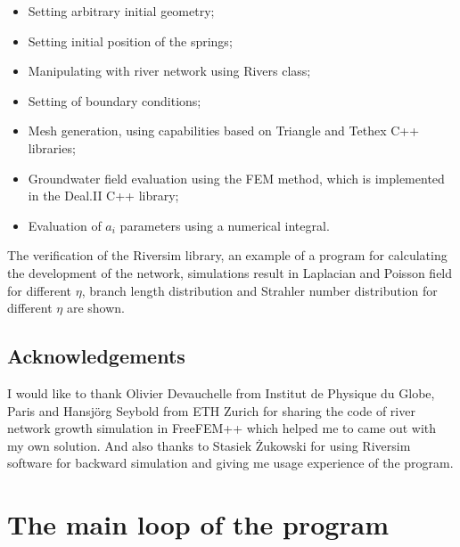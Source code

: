 \documentclass[]{pracamgr}
\begin{document}
    \vspace{-\topsep}
    \begin{itemize}
      \item Setting arbitrary initial geometry;
      \item Setting initial position of the springs;
      \item Manipulating with river network using Rivers class;
      \item Setting of boundary conditions;
      \item Mesh generation, using capabilities based on Triangle and Tethex C++ libraries;
      \item Groundwater field evaluation using the FEM method, which is implemented in the Deal.II C++ library;
      \item Evaluation of $a_i$ parameters using a numerical integral.
    \end{itemize}

    The verification of the Riversim library, an example of a program for calculating the development of the network, simulations result in Laplacian and Poisson field for different $\eta$, branch length distribution and Strahler number distribution for different $\eta$ are shown.\par

    \section*{Acknowledgements}
      
      I would like to thank Olivier Devauchelle from Institut de Physique du Globe, Paris and Hansjörg Seybold from ETH Zurich for sharing the code of river network growth simulation in FreeFEM++ which helped me to came out with my own solution. And also thanks to Stasiek Żukowski for using Riversim software for backward simulation and giving me usage experience of the program.

    

  \appendix

  \chapter{The main loop of the program}
    
\end{document}
